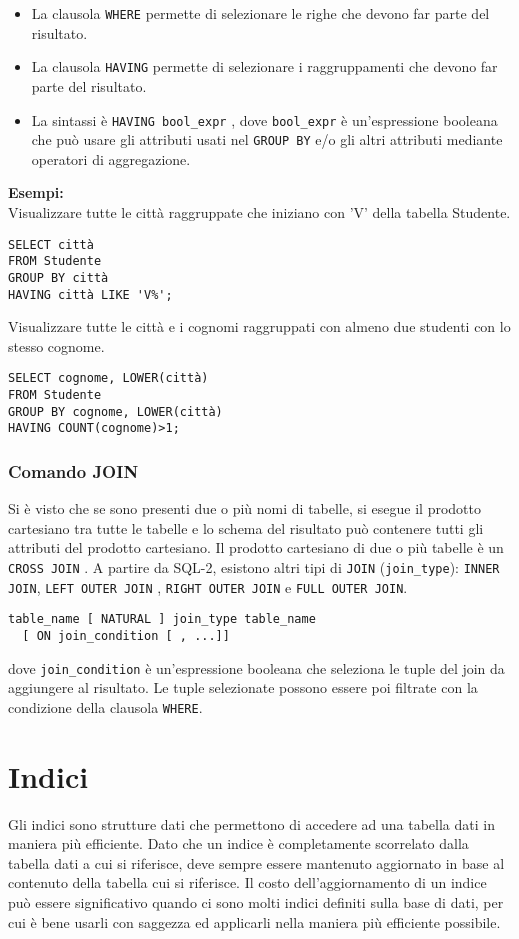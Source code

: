 \documentclass[a4paper, 10pt]{article}
\begin{document}
		\begin{itemize}
			\item La clausola \lstinline|WHERE| permette di selezionare le righe che devono far parte
			del risultato.
			\item La clausola \lstinline|HAVING| permette di selezionare i raggruppamenti che
			devono far parte del risultato.
			\item La sintassi è \lstinline|HAVING bool_expr| , dove \lstinline|bool_expr| è un'espressione
			booleana che può usare gli attributi usati nel \lstinline|GROUP BY| e/o gli altri
			attributi mediante operatori di aggregazione.
		\end{itemize}
		\textbf{Esempi: }\\
		Visualizzare tutte le città raggruppate che iniziano con ’V’ della tabella
		Studente.
		\begin{lstlisting}
SELECT città
FROM Studente
GROUP BY città
HAVING città LIKE 'V%';
		\end{lstlisting}
		Visualizzare tutte le città e i cognomi raggruppati con almeno due studenti
		con lo stesso cognome.
		\begin{lstlisting}
SELECT cognome, LOWER(città)
FROM Studente
GROUP BY cognome, LOWER(città)
HAVING COUNT(cognome)>1;
		\end{lstlisting}
		
		\subsubsection{Comando JOIN}
			Si è visto che se sono presenti due o più nomi di tabelle, si esegue il
			prodotto cartesiano tra tutte le tabelle e lo schema del risultato può
			contenere tutti gli attributi del prodotto cartesiano.
			Il prodotto cartesiano di due o più tabelle è un \lstinline|CROSS JOIN| .
			A partire da SQL-2, esistono altri tipi di \lstinline|JOIN| (\lstinline|join_type|):
			\lstinline|INNER JOIN|, \lstinline|LEFT OUTER JOIN| , \lstinline|RIGHT OUTER JOIN| e \lstinline|FULL OUTER JOIN|.
			
			\begin{lstlisting}
table_name [ NATURAL ] join_type table_name 
  [ ON join_condition [ , ...]]
			\end{lstlisting}
			dove \lstinline|join_condition| è un’espressione booleana che seleziona le tuple del join
			da aggiungere al risultato. Le tuple selezionate possono essere poi filtrate
			con la condizione della clausola \lstinline|WHERE|.
			
	\section{Indici}
	Gli indici sono strutture dati che permettono di accedere ad una tabella dati in maniera più efficiente. Dato che un indice è completamente scorrelato dalla tabella dati a cui si riferisce, deve sempre essere mantenuto aggiornato in base al contenuto della tabella cui si riferisce. Il costo dell'aggiornamento di un indice può essere significativo quando ci sono molti indici definiti sulla base di dati, per cui è bene usarli con saggezza ed applicarli nella maniera più efficiente possibile.
	
\end{document}
